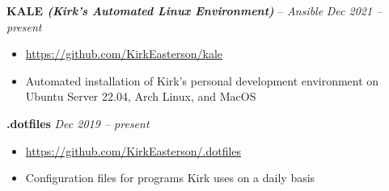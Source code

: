 \documentclass[10pt,letterpaper]{article}
\begin{document}
\headedsection
{\textbf{KALE \textit{(Kirk's Automated Linux Environment)}} -- \textit{Ansible}}
{\textit{Dec 2021 -- present}} {
	\begin{itemize}[noitemsep,nolistsep]
		\item \url{https://github.com/KirkEasterson/kale}
		\item Automated installation of Kirk's personal development environment on Ubuntu Server 22.04, Arch Linux, and MacOS
	\end{itemize}
}

\headedsection
{\textbf{.dotfiles}}
{\textit{Dec 2019 -- present}} {
	\begin{itemize}[noitemsep,nolistsep]
		\item \url{https://github.com/KirkEasterson/.dotfiles}
		\item Configuration files for programs Kirk uses on a daily basis
	\end{itemize}
}
\end{document}
